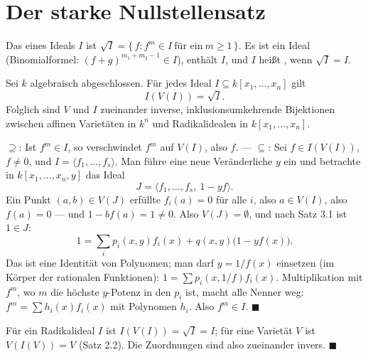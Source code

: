 \section{Der starke Nullstellensatz}

\begin{definition}
Das  eines Ideals $I$ ist $\sqrt I = \{\,f : f^{m}\in I\ \text{für ein}\ m\ge1\,\}$. Es ist ein Ideal (Binomialformel: $(f + g)^{m_1 + m_2 - 1}\in I$), enthält $I$, und $I$ heißt , wenn $\sqrt I = I$.
\end{definition}

\begin{merksatz}
Sei $k$ algebraisch abgeschlossen. Für jedes Ideal $I\subseteq k[x_1, \ldots, x_n]$ gilt
\[ I(V(I)) = \sqrt I . \]
Folglich sind $V$ und $I$ zueinander inverse, inklusionsumkehrende Bijektionen zwischen affinen Varietäten in $k^{n}$ und Radikalidealen in $k[x_1, \ldots, x_n]$.

$\supseteq$: Ist $f^{m}\in I$, so verschwindet $f^{m}$ auf $V(I)$, also $f$. --- $\subseteq$: Sei $f\in I(V(I))$, $f\ne0$, und $I = \langle f_1, \ldots, f_s\rangle$. Man führe eine neue Veränderliche $y$ ein und betrachte in $k[x_1, \ldots, x_n, y]$ das Ideal
\[ J = \langle f_1, \ldots, f_s,\ 1 - yf\rangle . \]
Ein Punkt $(a, b)\in V(J)$ erfüllte $f_i(a) = 0$ für alle $i$, also $a\in V(I)$, also $f(a) = 0$ --- und $1 - bf(a) = 1\ne0$. Also $V(J) = \emptyset$, und nach Satz 3.1 ist $1\in J$:
\[ 1 = \sum_{i}p_i(x, y)f_i(x) + q(x, y)\bigl(1 - yf(x)\bigr) . \]
Das ist eine Identität von Polynomen; man darf $y = 1/f(x)$ einsetzen (im Körper der rationalen Funktionen): $1 = \sum p_i(x, 1/f)f_i(x)$. Multiplikation mit $f^{m}$, wo $m$ die höchste $y$-Potenz in den $p_i$ ist, macht alle Nenner weg: $f^{m} = \sum h_i(x)f_i(x)$ mit Polynomen $h_i$. Also $f^{m}\in I$. $\blacksquare$

Für ein Radikalideal $I$ ist $I(V(I)) = \sqrt I = I$; für eine Varietät $V$ ist $V(I(V)) = V$ (Satz 2.2). Die Zuordnungen sind also zueinander invers. $\blacksquare$


\end{merksatz}
